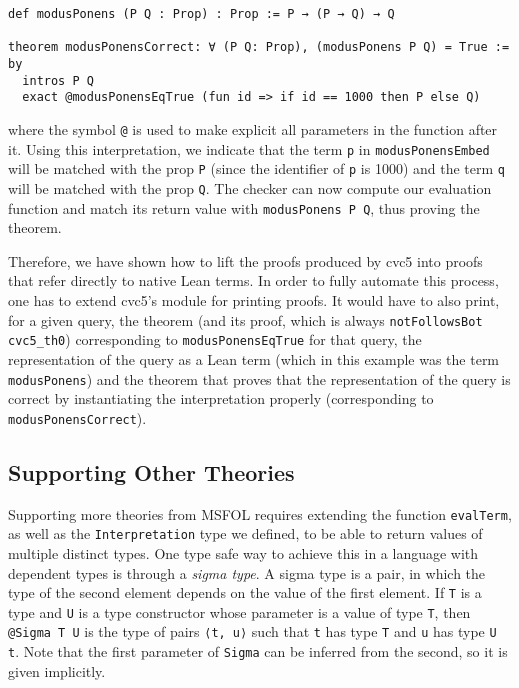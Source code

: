 \begin{verbatim}
def modusPonens (P Q : Prop) : Prop := P → (P → Q) → Q

theorem modusPonensCorrect: ∀ (P Q: Prop), (modusPonens P Q) = True := by
  intros P Q
  exact @modusPonensEqTrue (fun id => if id == 1000 then P else Q)
\end{verbatim}
where the symbol \texttt{@} is used to make explicit all parameters
in the function after it. Using this interpretation, we indicate
that the term \texttt{p} in \texttt{modusPonensEmbed}
will be matched with the prop \texttt{P} (since the identifier of \texttt{p}
is 1000) and the term \texttt{q} will be matched with the prop \texttt{Q}.
The checker can now compute our evaluation function and
match its return value with \texttt{modusPonens P Q}, thus proving the theorem.

Therefore, we have shown how to lift the proofs produced by cvc5 into proofs
that refer directly to native Lean terms. In order to fully automate this
process, one has to extend cvc5's module for printing proofs. It would
have to also print, for a given query, the theorem (and its proof, which is always
\texttt{notFollowsBot cvc5\_th0}) corresponding to \texttt{modusPonensEqTrue} for that query,
the representation of the query as a Lean term (which in this example was the term \texttt{modusPonens})
and the theorem that proves that the representation of the query is correct by instantiating the interpretation
properly (corresponding to \texttt{modusPonensCorrect}).

\subsection{Supporting Other Theories}

Supporting more theories from MSFOL requires extending the function \texttt{evalTerm},
as well as the \texttt{Interpretation} type we defined, to be able to return values
of multiple distinct types. One type safe way to achieve this in a language with
dependent types is through a \textit{sigma type}. A sigma type is a pair, in which
the type of the second element depends on the value of the first element. If
\texttt{T} is a type and \texttt{U} is a type constructor whose parameter
is a value of type \texttt{T},
then \texttt{@Sigma T U} is the type
of pairs \texttt{⟨t, u⟩} such that \texttt{t} has type \texttt{T} and
\texttt{u} has type \texttt{U t}. Note that the first parameter of \texttt{Sigma}
can be inferred from the second, so it is given implicitly.

